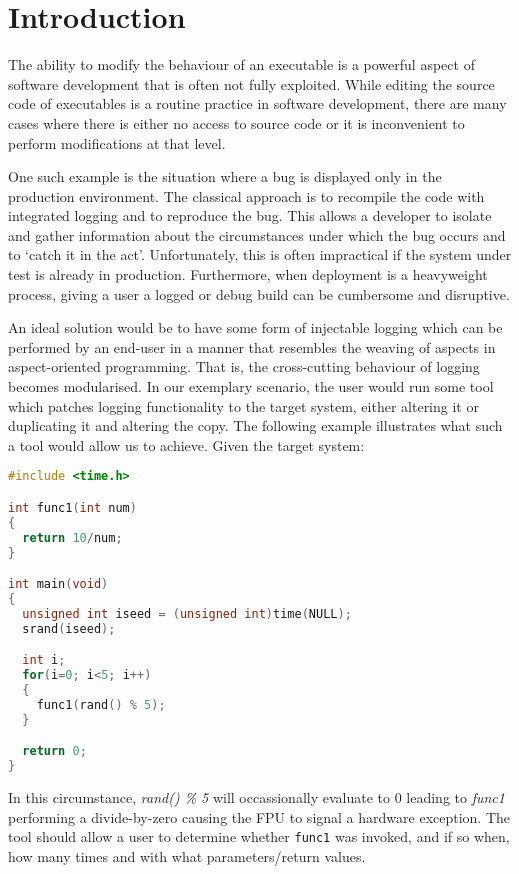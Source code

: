 \chapter{Introduction}

The ability to modify the behaviour of an executable is a powerful aspect of software development that is often not fully exploited. While editing the source code of executables is a routine practice in software development, there are many cases where there is either no access to source code or it is inconvenient to perform modifications at that level.

One such example is the situation where a bug is displayed only in the production environment. The classical approach is to recompile the code with integrated logging and to reproduce the bug. This allows a developer to isolate and gather information about the circumstances under which the bug occurs and to `catch it in the act'. Unfortunately, this is often impractical if the system under test is already in production. Furthermore, when deployment is a heavyweight process, giving a user a logged or debug build can be cumbersome and disruptive.

An ideal solution would be to have some form of injectable logging which can be performed by an end-user in a manner that resembles the weaving of aspects in aspect-oriented programming. That is, the cross-cutting behaviour of logging becomes modularised. In our exemplary scenario, the user would run some tool which patches logging functionality to the target system, either altering it or duplicating it and altering the copy. The following example illustrates what such a tool would allow us to achieve. Given the target system:

\begin{lstlisting}[language=C,caption={Target Process}]
#include <time.h>

int func1(int num)
{
  return 10/num;
}

int main(void)
{
  unsigned int iseed = (unsigned int)time(NULL);
  srand(iseed);

  int i;
  for(i=0; i<5; i++)
  {
    func1(rand() % 5);
  }

  return 0;
}
\end{lstlisting}

In this circumstance, \emph{rand() \% 5} will occassionally evaluate to 0 leading to \emph{func1} performing a divide-by-zero causing the FPU to signal a hardware exception. The tool should allow a user to determine whether \texttt{func1} was invoked, and if so when, how many times and with what parameters/return values.

